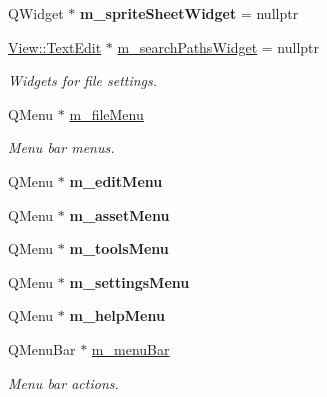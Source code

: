 \begin{Indent}
\begin{DoxyCompactItemize}
Q\+Widget $\ast$ {\bfseries m\+\_\+sprite\+Sheet\+Widget} = nullptr
\item 
\mbox{\label{classrev_1_1_main_window_a3b3880f6676dc41679c1d84609100ec6}} 
\mbox{\hyperlink{classrev_1_1_view_1_1_text_edit}{View\+::\+Text\+Edit}} $\ast$ \mbox{\hyperlink{classrev_1_1_main_window_a3b3880f6676dc41679c1d84609100ec6}{m\+\_\+search\+Paths\+Widget}} = nullptr
\begin{DoxyCompactList}\small\item\em Widgets for file settings. \end{DoxyCompactList}\item 
\mbox{\label{classrev_1_1_main_window_a4d3b8e73ca8cc65568d640b3a5d861f7}} 
Q\+Menu $\ast$ \mbox{\hyperlink{classrev_1_1_main_window_a4d3b8e73ca8cc65568d640b3a5d861f7}{m\+\_\+file\+Menu}}
\begin{DoxyCompactList}\small\item\em Menu bar menus. \end{DoxyCompactList}\item 
\mbox{\label{classrev_1_1_main_window_a2abe50befcb2712f3ab56d325bca0525}} 
Q\+Menu $\ast$ {\bfseries m\+\_\+edit\+Menu}
\item 
\mbox{\label{classrev_1_1_main_window_a9920155049da6f0eb9ec37a32630753a}} 
Q\+Menu $\ast$ {\bfseries m\+\_\+asset\+Menu}
\item 
\mbox{\label{classrev_1_1_main_window_a52af47c10536ce070d4ce5d5e2ff6c5d}} 
Q\+Menu $\ast$ {\bfseries m\+\_\+tools\+Menu}
\item 
\mbox{\label{classrev_1_1_main_window_a1c4a7b09d855c7b6042ab1deb1388969}} 
Q\+Menu $\ast$ {\bfseries m\+\_\+settings\+Menu}
\item 
\mbox{\label{classrev_1_1_main_window_aef81a2e1fc1e602bbb6024af857a512e}} 
Q\+Menu $\ast$ {\bfseries m\+\_\+help\+Menu}
\item 
Q\+Menu\+Bar $\ast$ \mbox{\hyperlink{classrev_1_1_main_window_a453701f94612424e40e1f77d7a223a32}{m\+\_\+menu\+Bar}}
\begin{DoxyCompactList}\small\item\em Menu bar actions. \end{DoxyCompactList}\item 

\end{DoxyCompactItemize}
\end{Indent}
